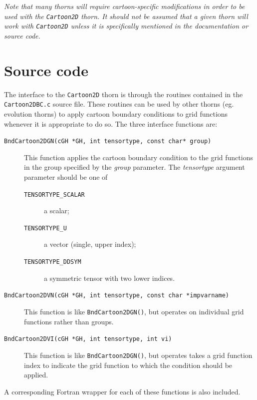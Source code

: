 \documentclass{article}
\begin{document}
\emph{Note that many thorns will require cartoon-specific
modifications in order to be used with the \texttt{Cartoon2D}
thorn. It should not be assumed that a given thorn will work with
\texttt{Cartoon2D} unless it is specifically mentioned in the
documentation or source code.}

\section{Source code}

The interface to the \texttt{Cartoon2D} thorn is through the routines
contained in the \texttt{Cartoon2DBC.c} source file. These routines
can be used by other thorns (eg. evolution thorns) to apply cartoon
boundary conditions to grid functions whenever it is appropriate to do
so. The three interface functions are:

\begin{description}

  \item[\texttt{BndCartoon2DGN(cGH *GH, int tensortype, const char*
      group)}]
    This function applies the cartoon boundary condition to the grid
    functions in the group specified by the \emph{group} parameter.
    The \emph{tensortype} argument parameter should be one of
    \begin{description}
      \item[\texttt{TENSORTYPE\_SCALAR}] a scalar;
      \item[\texttt{TENSORTYPE\_U}] a vector (single, upper index);
      \item[\texttt{TENSORTYPE\_DDSYM}] a symmetric tensor with two
	lower indices.
    \end{description}

  \item[\texttt{BndCartoon2DVN(cGH *GH, int tensortype, const char
      *impvarname)}]
    This function is like \texttt{BndCartoon2DGN()}, but operates on
    individual grid functions rather than groups.

  \item[\texttt{BndCartoon2DVI(cGH *GH, int tensortype, int vi)}]
    This function is like \texttt{BndCartoon2DGN()}, but operates
    takes a grid function index to indicate the grid function to which
    the condition should be applied.

\end{description}

A corresponding Fortran wrapper for each of these functions is also
included.
\end{document}
